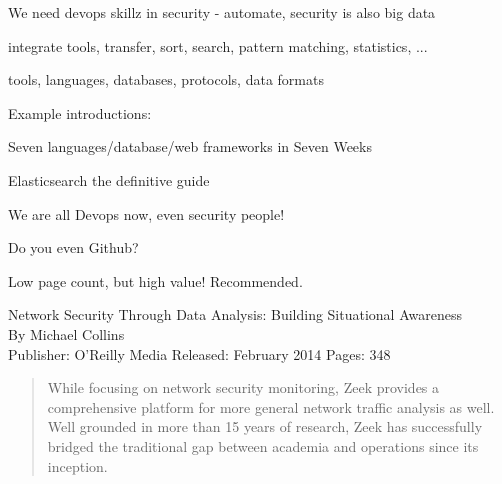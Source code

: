 \documentclass[20pt,landscape,a4paper,footrule]{foils}
\begin{document}

\begin{list1}
\item We need devops skillz in security - automate, security is also big data
\item integrate tools, transfer, sort, search, pattern matching, statistics, ...
\item tools, languages, databases, protocols, data formats
\item Example introductions:
\begin{list2}
\item Seven languages/database/web frameworks in Seven Weeks
\item Elasticsearch the definitive guide\\
\item {}
\item {}
\end{list2}
\end{list1}

\centerline{We are all Devops now, even security people!}

Do you even Github? \smiley {}



Low page count, but high value! Recommended.

Network Security Through Data Analysis: Building Situational Awareness\\
By Michael Collins\\
Publisher: O'Reilly Media
Released: February 2014 Pages: 348





\begin{quote}
While focusing on network security monitoring, Zeek provides a comprehensive platform for more general network traffic analysis as well. Well grounded in more than 15 years of research, Zeek has successfully bridged the traditional gap between academia and operations since its inception.
\end{quote}

\end{document}
